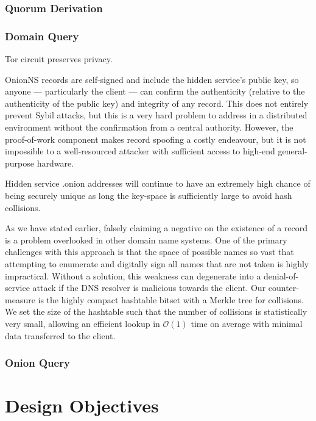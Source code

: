 \subsubsection{Quorum Derivation}

\subsubsection{Domain Query}

Tor circuit preserves privacy.

OnionNS records are self-signed and include the hidden service's public key, so anyone --- particularly the client --- can confirm the authenticity (relative to the authenticity of the public key) and integrity of any record. This does not entirely prevent Sybil attacks, but this is a very hard problem to address in a distributed environment without the confirmation from a central authority. However, the proof-of-work component makes record spoofing a costly endeavour, but it is not impossible to a well-resourced attacker with sufficient access to high-end general-purpose hardware.

Hidden service .onion addresses will continue to have an extremely high chance of being securely unique as long the key-space is sufficiently large to avoid hash collisions.

As we have stated earlier, falsely claiming a negative on the existence of a record is a problem overlooked in other domain name systems. One of the primary challenges with this approach is that the space of possible names so vast that attempting to enumerate and digitally sign all names that are not taken is highly impractical. Without a solution, this weakness can degenerate into a denial-of-service attack if the DNS resolver is malicious towards the client. Our counter-measure is the highly compact hashtable bitset with a Merkle tree for collisions. We set the size of the hashtable such that the number of collisions is statistically very small, allowing an efficient lookup in $ \mathcal{O}(1) $ time on average with minimal data transferred to the client.

\subsubsection{Onion Query}

\section{Design Objectives}

